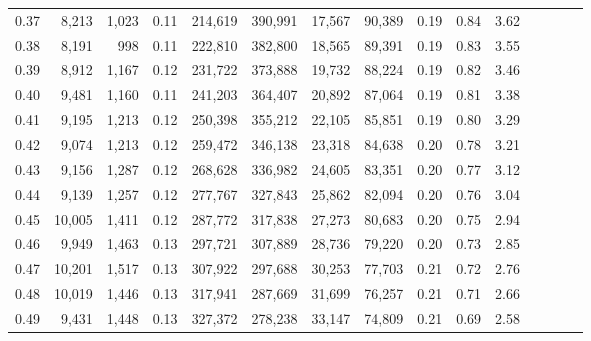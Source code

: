 \begin{tabular}{rrrcrrrrrrrrrrr}
0.37 &   8,213 &  1,023 &                                       0.11 &  214,619 &  390,991 &   17,567 &   90,389 &  0.19 &  0.84 &                         3.62 \\
0.38 &   8,191 &    998 &                                       0.11 &  222,810 &  382,800 &   18,565 &   89,391 &  0.19 &  0.83 &                         3.55 \\
0.39 &   8,912 &  1,167 &                                       0.12 &  231,722 &  373,888 &   19,732 &   88,224 &  0.19 &  0.82 &                         3.46 \\
0.40 &   9,481 &  1,160 &                                       0.11 &  241,203 &  364,407 &   20,892 &   87,064 &  0.19 &  0.81 &                         3.38 \\
0.41 &   9,195 &  1,213 &                                       0.12 &  250,398 &  355,212 &   22,105 &   85,851 &  0.19 &  0.80 &                         3.29 \\
0.42 &   9,074 &  1,213 &                                       0.12 &  259,472 &  346,138 &   23,318 &   84,638 &  0.20 &  0.78 &                         3.21 \\
0.43 &   9,156 &  1,287 &                                       0.12 &  268,628 &  336,982 &   24,605 &   83,351 &  0.20 &  0.77 &                         3.12 \\
0.44 &   9,139 &  1,257 &                                       0.12 &  277,767 &  327,843 &   25,862 &   82,094 &  0.20 &  0.76 &                         3.04 \\
0.45 &  10,005 &  1,411 &                                       0.12 &  287,772 &  317,838 &   27,273 &   80,683 &  0.20 &  0.75 &                         2.94 \\
0.46 &   9,949 &  1,463 &                                       0.13 &  297,721 &  307,889 &   28,736 &   79,220 &  0.20 &  0.73 &                         2.85 \\
0.47 &  10,201 &  1,517 &                                       0.13 &  307,922 &  297,688 &   30,253 &   77,703 &  0.21 &  0.72 &                         2.76 \\
0.48 &  10,019 &  1,446 &                                       0.13 &  317,941 &  287,669 &   31,699 &   76,257 &  0.21 &  0.71 &                         2.66 \\
0.49 &   9,431 &  1,448 &                                       0.13 &  327,372 &  278,238 &   33,147 &   74,809 &  0.21 &  0.69 &                         2.58 \\

\end{tabular}
